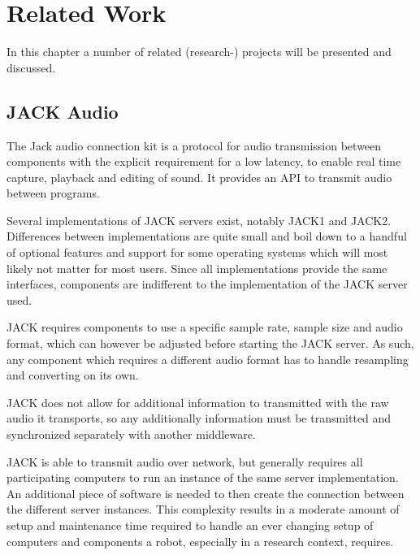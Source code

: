 
\chapter{Related Work}

In this chapter a number of related (research-) projects will be presented and discussed. 


\section{JACK Audio}

The Jack audio connection kit \cite{JACK} is a protocol for audio transmission between components with the explicit requirement for a low latency, to enable real time capture, playback and editing of sound. 
It provides an API to transmit audio between programs. 

Several implementations of JACK servers exist, notably JACK1 and JACK2. 
Differences between implementations are quite small and boil down to a handful of optional features and support for some operating systems which will most likely not matter for most users. %
Since all implementations provide the same interfaces, components are indifferent to the implementation of the JACK server used. 

JACK requires components to use a specific sample rate, sample size and audio format, which can however be adjusted before starting the JACK server. 
As such, any component which requires a different audio format has to handle resampling and converting on its own. 

JACK does not allow for additional information to transmitted with the raw audio it transports, so any additionally information must be transmitted and synchronized separately with another middleware. 

JACK is able to transmit audio over network, but generally requires all participating computers to run an instance of the same server implementation. 
An additional piece of software is needed to then create the connection between the different server instances. 
This complexity results in a moderate amount of setup and maintenance time required to handle an ever changing setup of computers and components a robot, especially in a research context, requires.

